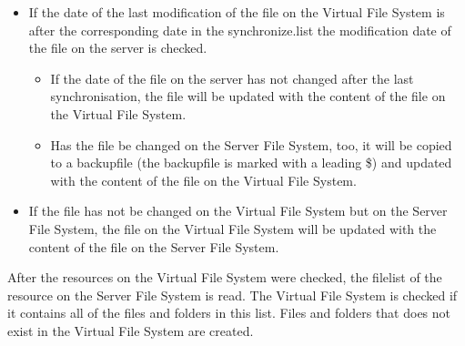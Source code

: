 \begin{itemize}
\item If the date of the last modification of the file on the Virtual File System is after the corresponding date in the {\dir synchronize.list} the modification date of the file on the server is checked. 
	\begin{itemize}
	\item If the date of the file on the server has not changed after the last synchronisation, the file will be updated with the content of the file on the Virtual File System. 
	\item Has the file be changed on the Server File System, too, it will be copied to a backupfile (the backupfile is marked with a leading {\name \$}) and updated with the content of the file on the Virtual File System.
	\end{itemize}
\item If the file has not be changed on the Virtual File System but on the Server File System, the file on the Virtual File System will be updated with the content of the file on the Server File System.
\end{itemize}

After the resources on the Virtual File System were checked, the filelist of the resource on the Server File System is read. The Virtual File System is checked if it contains all of the files and folders in this list. Files and folders that does not exist in the Virtual File System are created.

